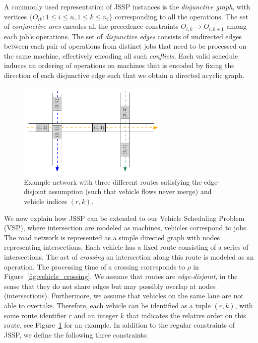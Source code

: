 \documentclass[notitlepage]{report}
\begin{document}
A commonly used representation of JSSP instances is the \textit{disjunctive
  graph}, with vertices $\{ O_{ik} : 1 \leq i \leq n, 1 \leq k \leq n_{i} \}$
corresponding to all the operations. The set of \textit{conjunctive arcs} encodes
all the precedence constraints $O_{i,k} \rightarrow O_{i,k+1} $ among each job's
operations. The set of \textit{disjunctive edges} consists of undirected edges
between each pair of operations from distinct jobs that need to be processed on
the same machine, effectively encoding all such \textit{conflicts}. Each valid
schedule induces an ordering of operations on machines that is encoded by fixing
the direction of each disjunctive edge such that we obtain a directed acyclic
graph.

\begin{figure}[h]
  \centering
  \includegraphics[width=0.65\textwidth]{figures/network_indices.pdf}
  \caption{Example network with three different routes satisfying the
    edge-disjoint assumption (such that vehicle flows never merge) and vehicle
    indices $(r,k)$.}
  \label{fig:network_indices}
\end{figure}

We now explain how JSSP can be extended to our Vehicle Scheduling Problem (VSP),
where intersection are modeled as machines, vehicles correspond to jobs.
The road network is represented as a simple directed graph with nodes
representing intersections. Each vehicle has a fixed route consisting of a
series of intersections. The act of \textit{crossing} an intersection along this
route is modeled as an operation. The processing time of a crossing corresponds
to $\rho$ in Figure~\ref{fig:vehicle_crossing}.
We assume that routes are \textit{edge-disjoint}, in the sense that they do not
share edges but may possibly overlap at nodes (intersections). Furthermore, we
assume that vehicles on the same lane are not able to overtake. Therefore, each
vehicle can be identified as a tuple $(r, k)$, with some route identifier $r$
and an integer $k$ that indicates the relative order on this route, see
Figure~\ref{fig:network_indices} for an example. In addition to the regular
constraints of JSSP, we define the following three constraints:
\end{document}

